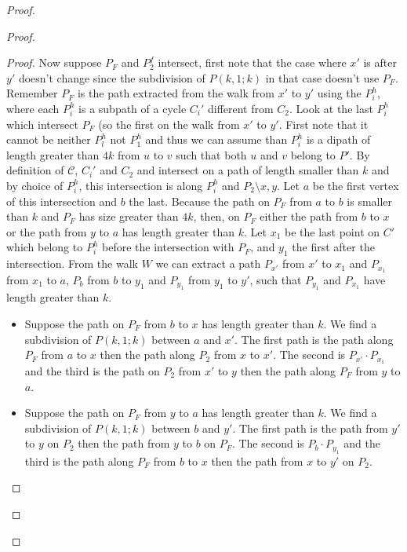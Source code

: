 \documentclass[10pt]{article}
\theoremstyle{plain}
\theoremstyle{definition}
\theoremstyle{remark}
\begin{document}
\begin{proof}
\begin{proof}
\begin{proof}
Now suppose $P_F$ and $P_2^f$ intersect, first note that the case where $x'$ is after $y'$ doesn't change since the subdivision 
of $P(k,1;k)$ in that case doesn't use $P_F$. Remember $P_F$ is the path extracted from the walk from $x'$ to $y'$ using the  $P_i^h$,
where each $P_i^h$ is a subpath of a cycle $C_i'$ different from $C_2$. Look at the last $P_i^h$ which intersect $P_F$ (so the first 
on the walk from $x'$ to $y'$. First note that it cannot be neither $P_l^h$ not $P_1^h$ and thus we can assume than $P_i^h$ is a dipath
of length greater than $4k$ from $u$ to $v$ such that both $u$ and $v$ belong to $P'$. By definition of $\mathcal{C}$, $C_i'$ and $C_2$ and
intersect on a path of length smaller than $k$ and by choice of $P_i^h$, this intersection is along $P_i^h$ and $P_2 \setminus{x,y}$. 
Let $a$ be the first vertex of this intersection and $b$ the last. Because the path on $P_F$ from $a$ to $b$ is smaller than $k$
and $P_F$ has size greater than $4k$, then, on $P_F$ either the path from $b$ to $x$ or the path from $y$ to $a$ has length greater than $k$.
Let $x_1$ be the last point on $C'$ which belong to $P_i^h$ before the intersection with $P_F$, and $y_1$ the first after the intersection. 
From the walk $W$ we can extract a path $P_{x'}$ from $x'$ to $x_1$ and $P_{x_1}$ from $x_1$ to $a$, $P_b$ from $b$ to $y_1$ and $P_{y_1}$ 
from $y_1$ to $y'$, such that $P_{y_1}$ and $P_{x_1}$ have length greater than $k$. 

\begin{itemize}
	\item Suppose the path on $P_F$ from $b$ to $x$ has length greater than $k$. We find a subdivision of $P(k,1;k)$ between $a$ and $x'$.
	The first path is the path along $P_F$ from $a$ to $x$ then the path along $P_2$ from $x$ to $x'$. The second is $P_{x'} \cdot P_{x_1} $
	and the third is the path on $P_2$ from $x'$ to $y$ then the path along $P_F$ from $y$ to $a$.
	\item Suppose the path on $P_F$ from $y$ to $a$ has length greater than $k$. We find a subdivision of $P(k,1;k)$ between $b$ and $y'$.
	The first path is the path from $y'$ to $y$ on $P_2$ then the path from $y$ to $b$ on $P_F$. The second is $P_b \cdot P_{y_1}$ and the third is 
	the path along $P_F$ from $b$ to $x$ then the path from $x$ to $y'$ on $P_2$. 
\end{itemize} 
\end{proof}






\end{proof}
\end{proof}
\end{document}

